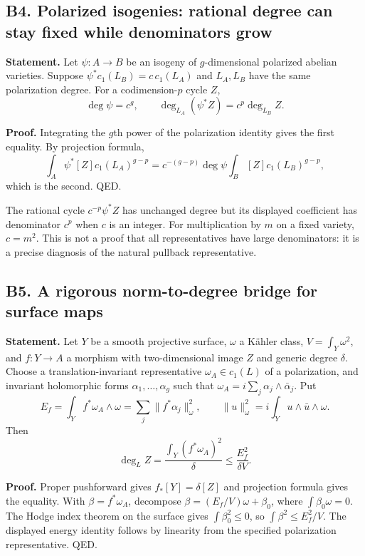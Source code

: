 \subsection{B4. Polarized isogenies: rational degree can stay fixed while denominators grow}\label{b4.-polarized-isogenies-rational-degree-can-stay-fixed-while-denominators-grow}

\textbf{Statement.} Let \(\psi:A\to B\) be an isogeny of \(g\)-dimensional polarized abelian varieties. Suppose \(\psi^*c_1(L_B)=c\,c_1(L_A)\) and \(L_A,L_B\) have the same polarization degree. For a codimension-\(p\) cycle \(Z\), \[
 \deg\psi=c^g,\qquad
 \deg_{L_A}(\psi^*Z)=c^p\deg_{L_B}Z.
\]

\textbf{Proof.} Integrating the \(g\)th power of the polarization identity gives the first equality. By projection formula, \[
 \int_A\psi^*[Z]c_1(L_A)^{g-p}
 =c^{-(g-p)}\deg\psi\int_B[Z]c_1(L_B)^{g-p},
\] which is the second. QED.

The rational cycle \(c^{-p}\psi^*Z\) has unchanged degree but its displayed coefficient has denominator \(c^p\) when \(c\) is an integer. For multiplication by \(m\) on a fixed variety, \(c=m^2\). This is not a proof that all representatives have large denominators: it is a precise diagnosis of the natural pullback representative.

\subsection{B5. A rigorous norm-to-degree bridge for surface maps}\label{b5.-a-rigorous-norm-to-degree-bridge-for-surface-maps}

\textbf{Statement.} Let \(Y\) be a smooth projective surface, \(\omega\) a Kähler class, \(V=\int_Y\omega^2\), and \(f:Y\to A\) a morphism with two-dimensional image \(Z\) and generic degree \(\delta\). Choose a translation-invariant representative \(\omega_A\in c_1(L)\) of a polarization, and invariant holomorphic forms \(\alpha_1,\ldots,\alpha_g\) such that \(\omega_A=i\sum_j\alpha_j\wedge\bar\alpha_j\). Put \[
 E_f=\int_Y f^*\omega_A\wedge\omega
 =\sum_j\|f^*\alpha_j\|_\omega^2,\qquad
 \|u\|_\omega^2=i\int_Yu\wedge\bar u\wedge\omega.
\] Then \[
 \deg_L Z=\frac{\int_Y(f^*\omega_A)^2}{\delta}
 \leq\frac{E_f^2}{\delta V}.
\]

\textbf{Proof.} Proper pushforward gives \(f_*[Y]=\delta[Z]\) and projection formula gives the equality. With \(\beta=f^*\omega_A\), decompose \(\beta=(E_f/V)\omega+\beta_0\), where \(\int\beta_0\omega=0\). The Hodge index theorem on the surface gives \(\int\beta_0^2\leq0\), so \(\int\beta^2\leq E_f^2/V\). The displayed energy identity follows by linearity from the specified polarization representative. QED.

